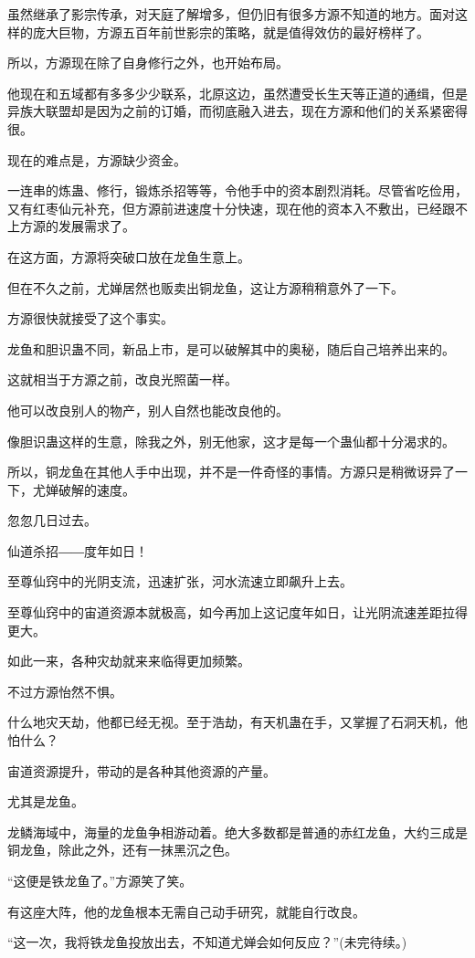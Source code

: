 \begin{this_body}
虽然继承了影宗传承，对天庭了解增多，但仍旧有很多方源不知道的地方。面对这样的庞大巨物，方源五百年前世影宗的策略，就是值得效仿的最好榜样了。

所以，方源现在除了自身修行之外，也开始布局。

他现在和五域都有多多少少联系，北原这边，虽然遭受长生天等正道的通缉，但是异族大联盟却是因为之前的订婚，而彻底融入进去，现在方源和他们的关系紧密得很。

现在的难点是，方源缺少资金。

一连串的炼蛊、修行，锻炼杀招等等，令他手中的资本剧烈消耗。尽管省吃俭用，又有红枣仙元补充，但方源前进速度十分快速，现在他的资本入不敷出，已经跟不上方源的发展需求了。

在这方面，方源将突破口放在龙鱼生意上。

但在不久之前，尤婵居然也贩卖出铜龙鱼，这让方源稍稍意外了一下。

方源很快就接受了这个事实。

龙鱼和胆识蛊不同，新品上市，是可以破解其中的奥秘，随后自己培养出来的。

这就相当于方源之前，改良光照菌一样。

他可以改良别人的物产，别人自然也能改良他的。

像胆识蛊这样的生意，除我之外，别无他家，这才是每一个蛊仙都十分渴求的。

所以，铜龙鱼在其他人手中出现，并不是一件奇怪的事情。方源只是稍微讶异了一下，尤婵破解的速度。

忽忽几日过去。

仙道杀招――度年如日！

至尊仙窍中的光阴支流，迅速扩张，河水流速立即飙升上去。

至尊仙窍中的宙道资源本就极高，如今再加上这记度年如日，让光阴流速差距拉得更大。

如此一来，各种灾劫就来来临得更加频繁。

不过方源怡然不惧。

什么地灾天劫，他都已经无视。至于浩劫，有天机蛊在手，又掌握了石洞天机，他怕什么？

宙道资源提升，带动的是各种其他资源的产量。

尤其是龙鱼。

龙鳞海域中，海量的龙鱼争相游动着。绝大多数都是普通的赤红龙鱼，大约三成是铜龙鱼，除此之外，还有一抹黑沉之色。

“这便是铁龙鱼了。”方源笑了笑。

有这座大阵，他的龙鱼根本无需自己动手研究，就能自行改良。

“这一次，我将铁龙鱼投放出去，不知道尤婵会如何反应？”(未完待续。)

\end{this_body}

